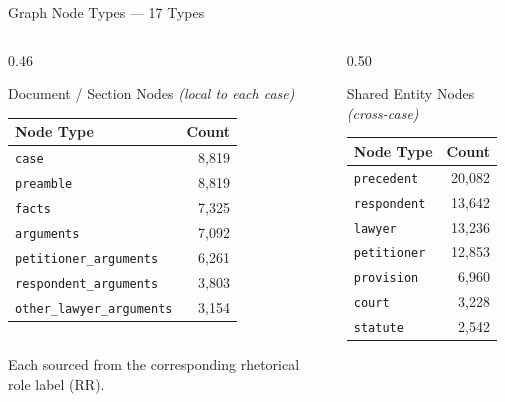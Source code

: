 \documentclass[aspectratio=169, 9pt]{beamer}
\begin{document}
\begin{frame}{Graph Node Types — 17 Types}
  \begin{columns}[T]
    \begin{column}{0.46\textwidth}
      \begin{block}{\small Document / Section Nodes \emph{(local to each case)}}
        \scriptsize\renewcommand{\arraystretch}{1.15}
        \begin{tabular}{lr}
          \toprule
          \textbf{Node Type} & \textbf{Count}\\
          \midrule
          \texttt{case}                     & 8,819\\
          \texttt{preamble}                 & 8,819\\
          \texttt{facts}                    & 7,325\\
          \texttt{arguments}                & 7,092\\
          \texttt{petitioner\_arguments}    & 6,261\\
          \texttt{respondent\_arguments}    & 3,803\\
          \texttt{other\_lawyer\_arguments} & 3,154\\
          \bottomrule
        \end{tabular}\\[4pt]
        Each sourced from the corresponding rhetorical role label (RR).
      \end{block}
    \end{column}
    \begin{column}{0.50\textwidth}
      \begin{block}{\small Shared Entity Nodes \emph{(cross-case)}}
        \scriptsize\renewcommand{\arraystretch}{1.15}
        \begin{tabular}{lr}
          \toprule
          \textbf{Node Type} & \textbf{Count}\\
          \midrule
          \texttt{precedent}          & 20,082\\
          \texttt{respondent}         & 13,642\\
          \texttt{lawyer}             & 13,236\\
          \texttt{petitioner}         & 12,853\\
          \texttt{provision}          &  6,960\\
          \texttt{court}              &  3,228\\
          \texttt{statute}            &  2,542\\

\end{tabular}
\end{block}
\end{column}
\end{columns}
\end{frame}
\end{document}
